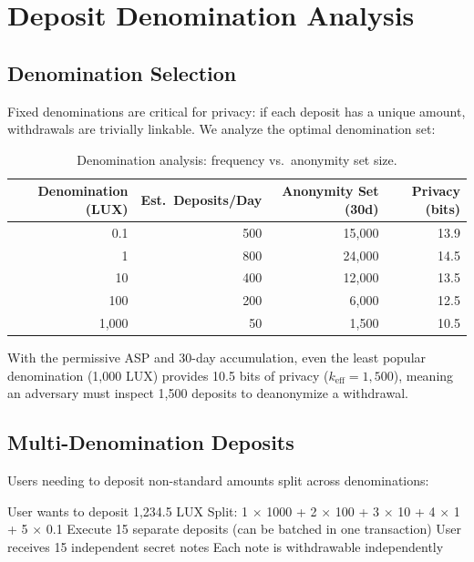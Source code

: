 \section{Deposit Denomination Analysis}
\label{sec:denominations}

\subsection{Denomination Selection}

Fixed denominations are critical for privacy: if each deposit has a unique amount, withdrawals are trivially linkable. We analyze the optimal denomination set:

\begin{table}[H]
\centering
\caption{Denomination analysis: frequency vs.\ anonymity set size.}
\label{tab:denominations}
\begin{tabular}{rrrr}
\toprule
\textbf{Denomination (LUX)} & \textbf{Est.\ Deposits/Day} & \textbf{Anonymity Set (30d)} & \textbf{Privacy (bits)} \\
\midrule
0.1 & 500 & 15,000 & 13.9 \\
1 & 800 & 24,000 & 14.5 \\
10 & 400 & 12,000 & 13.5 \\
100 & 200 & 6,000 & 12.5 \\
1,000 & 50 & 1,500 & 10.5 \\
\bottomrule
\end{tabular}
\end{table}

\begin{proposition}
With the permissive ASP and 30-day accumulation, even the least popular denomination (1,000 LUX) provides 10.5 bits of privacy ($k_{\text{eff}} = 1{,}500$), meaning an adversary must inspect 1,500 deposits to deanonymize a withdrawal.
\end{proposition}

\subsection{Multi-Denomination Deposits}

Users needing to deposit non-standard amounts split across denominations:

\begin{algorithm}[H]
\caption{Multi-Denomination Deposit}
\label{alg:multidenom}
\begin{algorithmic}[1]
\Require User wants to deposit 1,234.5 LUX
\State Split: 1 $\times$ 1000 + 2 $\times$ 100 + 3 $\times$ 10 + 4 $\times$ 1 + 5 $\times$ 0.1
\State Execute 15 separate deposits (can be batched in one transaction)
\State User receives 15 independent secret notes
\State Each note is withdrawable independently
\end{algorithmic}
\end{algorithm}

